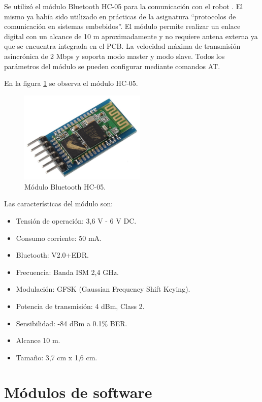 Se utilizó el módulo Bluetooth HC-05 para la comunicación con el robot \citep{HC05}. El mismo ya había sido utilizado en  prácticas de la asignatura “protocolos de comunicación en sistemas embebidos”.
El módulo permite realizar un enlace digital con un alcance de 10 m aproximadamente y no requiere antena externa ya que se encuentra integrada en el PCB. La velocidad máxima de transmisión asincrónica de 2 Mbps y soporta modo master y modo slave.
Todos los parámetros del módulo se pueden configurar mediante comandos AT. 

En la figura \ref{fig:moduloHC05} se observa el módulo HC-05.


\begin{figure}[h]
	\centering
	\includegraphics[width=6cm]{./Figures/HC05.jpeg}
	\caption{Módulo Bluetooth HC-05\protect\footnotemark.}
	\label{fig:moduloHC05}
\end{figure}



Las características del módulo son:
\begin{itemize}
	\item Tensión de operación: 3,6 V - 6 V DC.
	\item Consumo corriente: 50 mA.
	\item Bluetooth: V2.0+EDR.
	\item Frecuencia: Banda ISM 2,4 GHz.
	\item Modulación: GFSK (Gaussian Frequency Shift Keying).
	\item Potencia de transmisión: 4 dBm, Class 2.
	\item Sensibilidad: -84 dBm a 0.1\% BER.
	\item Alcance 10 m.
	\item Tamaño: 3,7 cm x 1,6 cm.
\end{itemize}


\section{Módulos de software}

